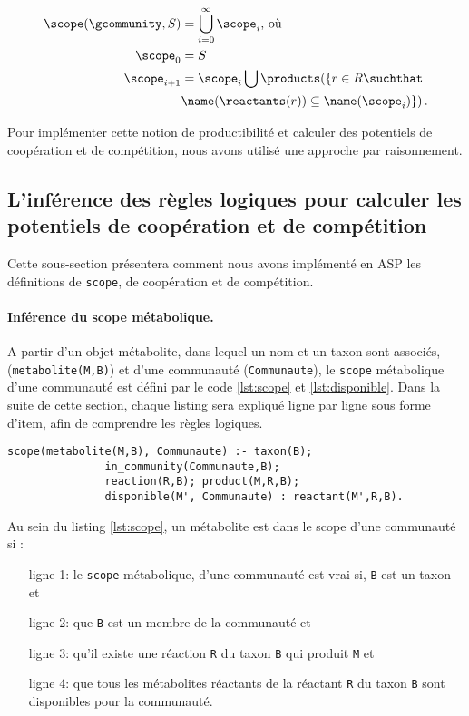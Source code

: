 \documentclass[../main.tex]{subfiles}
\begin{document}
\[
\begin{split}
    \scope(\gcommunity,S) & = \bigcup^{\infty}_{i=0} \scope_i \mbox{, où} \\
    \scope_0 & = S\\
    \scope_{i+1} & = \scope_i \bigcup \products(\{ r \in R \suchthat \\ 
     & \name(\reactants(r)) \subseteq \name(\scope_i) \}) \,.
\end{split}
\]

Pour implémenter cette notion de productibilité et calculer des potentiels de coopération et de compétition, nous avons utilisé une approche par raisonnement.

\subsection{L'inférence des règles logiques pour calculer les potentiels de coopération et de compétition}
Cette sous-section présentera comment nous avons implémenté en ASP les définitions de \texttt{scope}, de coopération et de compétition.

\paragraph*{Inférence du scope métabolique.} 
A partir d'un objet métabolite, dans lequel un nom et un taxon sont associés, (\texttt{metabolite(M,B)}) et d'une communauté (\texttt{Communaute}), le \texttt{scope} métabolique d'une communauté est défini par le code \ref{lst:scope} et \ref{lst:disponible}. Dans la suite de cette section, chaque listing sera expliqué ligne par ligne sous forme d'item, afin de comprendre les règles logiques. 

\begin{lstlisting}[mathescape=True,label={lst:scope},caption={Code ASP permettant de calculer le scope métabolique}, captionpos=b]
scope(metabolite(M,B), Communaute) :- taxon(B);  
               in_community(Communaute,B); 
               reaction(R,B); product(M,R,B); 
               disponible(M', Communaute) : reactant(M',R,B).
\end{lstlisting}

Au sein du listing \ref{lst:scope}, un métabolite est dans le scope d'une communauté si :
\begin{itemize}
	\item[ligne 1:] le \texttt{scope} métabolique, d'une communauté est vrai si, \texttt{B} est un taxon et
	\item[ligne 2:] que \texttt{B} est un membre de la communauté et
	\item[ligne 3:] qu'il existe une réaction \texttt{R} du taxon \texttt{B} qui produit \texttt{M} et 
	\item[ligne 4:] que tous les métabolites réactants de la réactant \texttt{R} du taxon \texttt{B} sont disponibles pour la communauté.\\
\end{itemize}
\end{document}
